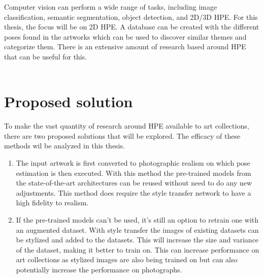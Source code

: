 Computer vision can perform a wide range of tasks, including image classification, semantic segmentation, object detection, and 2D/3D \gls{HPE}.
For this thesis, the focus will be on 2D HPE.
A database can be created with the different poses found in the artworks which can be used to discover similar themes and categorize them.
There is an extensive amount of research based around HPE that can be useful for this.
\\
\\

\section{Proposed solution}

To make the vast quantity of research around HPE available to art collections, there are two proposed solutions that will be explored.
The efficacy of these methods wil be analyzed in this thesis.

\begin{enumerate}
    \item The input artwork is first converted to photographic realism on which pose estimation is then executed.
With this method the pre-trained models from the state-of-the-art architectures can be reused without need to do any new adjustments.
This method does require the style transfer network to have a high fidelity to realism.
    \item If the pre-trained models can't be used, it's still an option to retrain one with an augmented dataset.
With style transfer the images of existing datasets can be stylized and added to the datasets.
This will increase the size and variance of the dataset, making it better to train on.
This can increase performance on art collections as stylized images are also being trained on but can also potentially increase the performance on photographs.
\end{enumerate}

